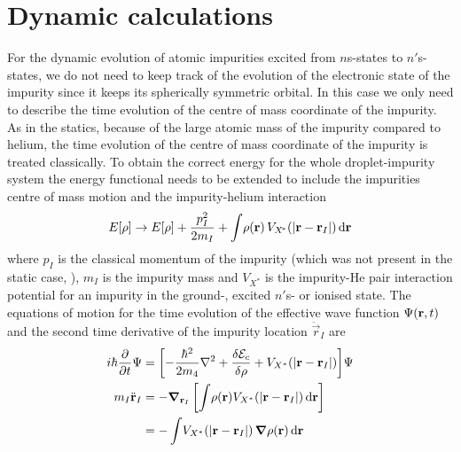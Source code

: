 	\section{Dynamic calculations}\label{sec:td-dft}
		For the dynamic evolution of atomic impurities excited from $n$s-states to $n'$s-states, we do not need to keep track of the evolution of the electronic state of the impurity since it keeps its spherically symmetric orbital. In this case we only need to describe the time evolution of the centre of mass coordinate of the impurity. As in the statics, because of the large atomic mass of the impurity compared to helium, the time evolution of the centre of mass coordinate of the impurity is treated classically. To obtain the correct energy for the whole droplet-impurity system the energy functional needs to be extended to include the impurities centre of mass motion and the impurity-helium interaction
		\begin{align}
			E[\rho] \rightarrow E[\rho] + \frac{p^2_I}{2 m_I} + \int \! \rho(\mathbf{r}) \, V_{X^{\!*}}\qty(\abs{\bm{\mathrm{r}}-\bm{\mathrm{r}}_I})\,\mathrm{d}{\bm{\mathrm{r}}} \label{eq33}
		\end{align}
		where $p_I$ is the classical momentum of the impurity (which was not present in the static case, ), $m_I$ is the impurity mass and $V_{X^{\!*}}$ is the impurity-He pair interaction potential for an impurity in the ground-, excited $n'$s- or ionised state. The equations of motion for the time evolution of the effective wave function $\Psi\qty(\bm{\mathrm{r}},t)$ and the second time derivative of the impurity location $\ddot{\vec{r}}_I$ are  
		\begin{align}
			i\hbar\frac{\partial}{\partial t} \Psi &= \qty[-\frac{\hbar^2}{2m_4} \laplacian +\frac{\delta {\cal E}_c}{\delta \rho} + V_{X^*}(|\mathbf{r}- \mathbf{r}_I|)]\Psi\nonumber\\
			m_I \ddot{\mathbf{r}}_I &= - \grad_{\vec{r}_I} \left[  \int \!\rho(\mathbf{r}) V_{X^*}(|\mathbf{r}- \mathbf{r}_I|)\diff{r}  \right] \nonumber \\
			&= -\int \! V_{X^*}(|\mathbf{r}- \mathbf{r}_I|)  \, \grad \rho(\mathbf{r})\diff{r} \label{eq34}
		\end{align}
	
